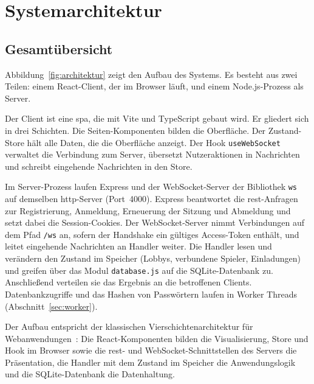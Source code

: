 \chapter{Systemarchitektur}
\label{kap:architektur}
\verfasser{\autorDG}

\section{Gesamtübersicht}
\label{sec:gesamt}

Abbildung~\ref{fig:architektur} zeigt den Aufbau des Systems. Es besteht aus zwei Teilen: einem React-Client, der im Browser läuft, und einem Node.js-Prozess als Server.

Der Client ist eine \gls{spa}, die mit Vite und TypeScript gebaut wird. Er gliedert sich in drei Schichten. Die Seiten-Komponenten bilden die Oberfläche. Der Zustand-Store hält alle Daten, die die Oberfläche anzeigt. Der Hook \texttt{useWebSocket} verwaltet die Verbindung zum Server, übersetzt Nutzeraktionen in Nachrichten und schreibt eingehende Nachrichten in den Store.

Im Server-Prozess laufen Express und der WebSocket-Server der Bibliothek \texttt{ws} auf demselben \gls{http}-Server (Port~4000). Express beantwortet die \gls{rest}-Anfragen zur Registrierung, Anmeldung, Erneuerung der Sitzung und Abmeldung und setzt dabei die Session-Cookies. Der WebSocket-Server nimmt Verbindungen auf dem Pfad \texttt{/ws} an, sofern der Handshake ein gültiges Access-Token enthält, und leitet eingehende Nachrichten an Handler weiter. Die Handler lesen und verändern den Zustand im Speicher (Lobbys, verbundene Spieler, Einladungen) und greifen über das Modul \texttt{database.js} auf die SQLite-Datenbank zu. Anschließend verteilen sie das Ergebnis an die betroffenen Clients. Datenbankzugriffe und das Hashen von Passwörtern laufen in Worker Threads (Abschnitt~\ref{sec:worker}).


Der Aufbau entspricht der klassischen Vierschichtenarchitektur für Webanwendungen~\cite[Folie~4]{SpechtNode}: Die React-Komponenten bilden die Visualisierung, Store und Hook im Browser sowie die \gls{rest}- und WebSocket-Schnittstellen des Servers die Präsentation, die Handler mit dem Zustand im Speicher die Anwendungslogik und die SQLite-Datenbank die Datenhaltung.

